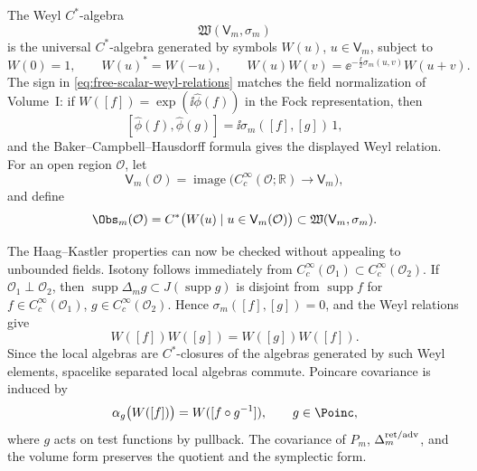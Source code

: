 The Weyl \(C^*\)-algebra
\[
  \mathfrak W(\mathsf V_m,\sigma_m)
\]
is the universal \(C^*\)-algebra generated by symbols \(W(u)\),
\(u\in\mathsf V_m\), subject to
\begin{equation}
  W(0)=1,\qquad W(u)^*=W(-u),\qquad
  W(u)W(v)=\ee^{-\frac{\ii}{2}\sigma_m(u,v)}W(u+v).
  \label{eq:free-scalar-weyl-relations}
\end{equation}
The sign in \eqref{eq:free-scalar-weyl-relations} matches the field
normalization of Volume~I: if \(W([f])=\exp(\ii\widehat\phi(f))\) in the Fock
representation, then
\[
  [\widehat\phi(f),\widehat\phi(g)]
  =
  \ii\sigma_m([f],[g])\,1,
\]
and the Baker--Campbell--Hausdorff formula gives the displayed Weyl relation.
For an open region \(\mathcal O\), let
\[
  \mathsf V_m(\mathcal O)
  =
  \operatorname{image}\bigl(C_c^\infty(\mathcal O;\mathbb R)
  \longrightarrow\mathsf V_m\bigr),
\]
and define
\begin{equation}
  \Obs_m(\mathcal O)
  =
  C^*\bigl(W(u)\mid u\in\mathsf V_m(\mathcal O)\bigr)
  \subset\mathfrak W(\mathsf V_m,\sigma_m).
  \label{eq:free-scalar-weyl-local-algebra}
\end{equation}

The Haag--Kastler properties can now be checked without appealing to
unbounded fields.  Isotony follows immediately from
\(C_c^\infty(\mathcal O_1)\subset C_c^\infty(\mathcal O_2)\).  If
\(\mathcal O_1\perp\mathcal O_2\), then
\(\operatorname{supp}\Delta_m g\subset J(\operatorname{supp}g)\) is disjoint
from \(\operatorname{supp}f\) for
\(f\in C_c^\infty(\mathcal O_1)\),
\(g\in C_c^\infty(\mathcal O_2)\).  Hence
\(\sigma_m([f],[g])=0\), and the Weyl relations give
\[
  W([f])W([g])=W([g])W([f]).
\]
Since the local algebras are \(C^*\)-closures of the algebras generated by
such Weyl elements, spacelike separated local algebras commute.  Poincare
covariance is induced by
\[
  \alpha_g\bigl(W([f])\bigr)=W([f\circ g^{-1}]),
  \qquad g\in\Poinc,
\]
where \(g\) acts on test functions by pullback.  The covariance of
\(P_m\), \(\Delta_m^{\rm ret/adv}\), and the volume form preserves the
quotient and the symplectic form.

